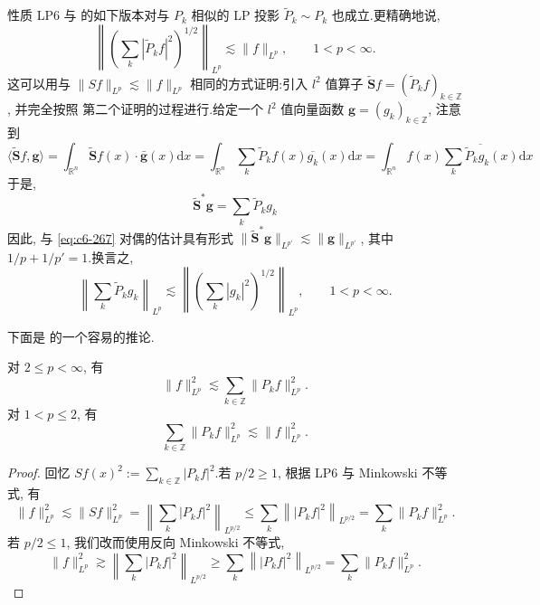 性质 LP6 与 的如下版本对与 $P_k$ 相似的 LP 投影 $\tilde{P}_k \sim P_k$ 也成立.更精确地说,
\begin{equation}
\left\|\left(\sum_k |\tilde{P}_k f|^2\right)^{1/2}\right\|_{L^p} \lesssim \|f\|_{L^p}, \qquad 1 < p < \infty.\label{eq:c6-267}
\end{equation}
这可以用与 $\|Sf\|_{L^p} \lesssim \|f\|_{L^p}$ 相同的方式证明:引入 $l^2$ 值算子 $\tilde{\mathbf{S}} f = (\tilde{P}_k f)_{k \in \mathbb{Z}}$, 并完全按照 第二个证明的过程进行.给定一个 $l^2$ 值向量函数 $\mathbf{g} = (g_k)_{k \in \mathbb{Z}}$, 注意到
\[
\langle \tilde{\mathbf{S}} f, \mathbf{g} \rangle = \int_{\mathbb{R}^n} \tilde{\mathbf{S}} f(x) \cdot \bar{\mathbf{g}}(x) \mathrm{d}x = \int_{\mathbb{R}^n} \sum_k \tilde{P}_k f(x) \overline{g_k}(x) \mathrm{d}x = \int_{\mathbb{R}^n} f(x) \overline{\sum_k \tilde{P}_k g_k (x)} \mathrm{d}x
\]
于是,
\begin{equation}
\tilde{\mathbf{S}}^* \mathbf{g} = \sum_k \tilde{P}_k g_k\label{eq:c6-268}
\end{equation}
因此, 与 \eqref{eq:c6-267} 对偶的估计具有形式 $\|\tilde{\mathbf{S}}^* \mathbf{g}\|_{L^{p'}} \lesssim \|\mathbf{g}\|_{L^{p'}}$, 其中 $1/p + 1/p' = 1$.换言之,
\begin{equation}
\left\|\sum_k \tilde{P}_k g_k\right\|_{L^p} \lesssim \left\|\left(\sum_k |g_k|^2\right)^{1/2}\right\|_{L^p}, \qquad 1 < p < \infty.\label{eq:c6-269}
\end{equation}

下面是 的一个容易的推论.

\begin{corollary}\label{cor:c6-6.15}
对 $2 \leq p < \infty$, 有
\begin{equation}
\|f\|^2_{L^p} \lesssim \sum_{k \in \mathbb{Z}} \|P_k f\|^2_{L^p}.\label{eq:c6-270}
\end{equation}
对 $1 < p \leq 2$, 有
\begin{equation}
\sum_{k \in \mathbb{Z}} \|P_k f\|^2_{L^p} \lesssim \|f\|^2_{L^p}.\label{eq:c6-271}
\end{equation}
\end{corollary}

\begin{proof}
回忆 $Sf(x)^2 := \sum_{k \in \mathbb{Z}} |P_k f|^2$.若 $p/2 \geq 1$, 根据 LP6 与 Minkowski 不等式, 有
\[
\|f\|^2_{L^p} \lesssim \|Sf\|^2_{L^p} = \left\|\sum_k |P_k f|^2\right\|_{L^{p/2}} \leq \sum_k \left\||P_k f|^2\right\|_{L^{p/2}} = \sum_k \|P_k f\|^2_{L^p}.
\]
若 $p/2 \leq 1$, 我们改而使用反向 Minkowski 不等式,
\[
\|f\|^2_{L^p} \gtrsim \left\|\sum_k |P_k f|^2\right\|_{L^{p/2}} \geq \sum_k \left\||P_k f|^2\right\|_{L^{p/2}} = \sum_k \|P_k f\|^2_{L^p}.
\]
\end{proof}

